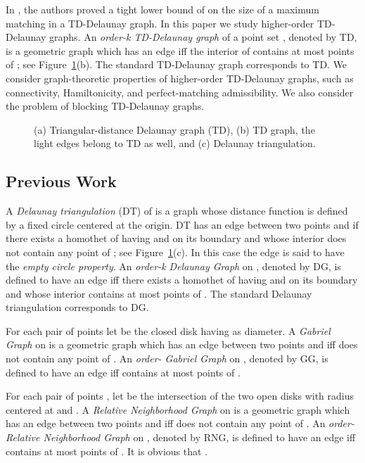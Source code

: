 \documentclass[11pt,a4paper]{article}
\newcommand{\kTD}[2]{\text{-}TD#2}
\newcommand{\kDT}[2]{\text{-}DG#2}
\newcommand{\kGG}[2]{\text{-}GG#2}
\newcommand{\kRNG}[2]{\text{-}RNG#2}
\begin{document}
In \cite{Babu2013}, the authors proved a tight lower bound of  on the size of a maximum matching in a TD-Delaunay graph. In this paper we study higher-order TD-Delaunay graphs. An {\em order-k TD-Delaunay graph} of a point set , denoted by \kTD{k}{}, is a geometric graph which has an edge  iff the interior of  contains at most  points of ; see Figure~\ref{TD}(b). The standard TD-Delaunay graph corresponds to \kTD{0}{}. We consider graph-theoretic properties of higher-order TD-Delaunay graphs, such as connectivity, Hamiltonicity, and perfect-matching admissibility. We also consider the problem of blocking TD-Delaunay graphs.

\begin{figure}[htb]
  \centering
\setlength{\tabcolsep}{0in}
  
  \caption{(a) Triangular-distance Delaunay graph (\kTD{0}{}), (b) \kTD{1}{} graph, the light edges belong to \kTD{0}{} as well, and (c) Delaunay triangulation.}
\label{TD}
\end{figure}

\subsection{Previous Work}
\label{previous-work}
A {\em Delaunay triangulation} (DT) of  is a graph whose distance function is defined by a fixed circle {\footnotesize } centered at the origin. DT has an edge between two points  and  if there exists a homothet of {\footnotesize } having  and  on its boundary and whose interior does not contain any point of ; see Figure~\ref{TD}(c). In this case the edge  is said to have the {\em empty circle property}. An {\em order-k
Delaunay Graph} on , denoted by \kDT{k}{}, is defined to have an edge  iff there exists a homothet of {\footnotesize } having  and  on its boundary and whose interior contains at most  points of . The standard Delaunay triangulation corresponds to \kDT{0}{}.  

For each pair of points  let  be the closed disk having  as diameter. A {\em Gabriel Graph} on  is a geometric graph which has an edge between two points  and  iff  does not contain any point of . An {\em order- Gabriel Graph} on , denoted by \kGG{k}{}, is defined to have an edge  iff  contains at most  points of .

For each pair of points , let  be the intersection of the two open disks with radius  centered at  and . A {\em Relative Neighborhood Graph} on  is a geometric graph which has an edge between two points  and  iff  does not contain any point of . An {\em order- Relative Neighborhood Graph} on , denoted by \kRNG{k}{}, is defined to have an edge  iff  contains at most  points of . It is obvious that .
\end{document}

